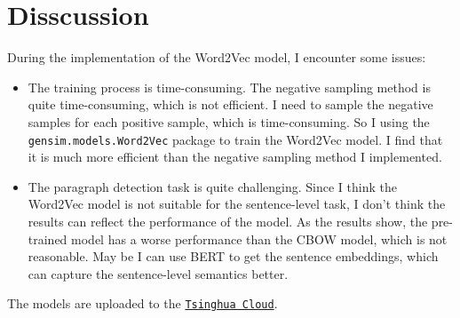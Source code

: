 \documentclass[UTF8,a4paper,12pt]{article}
\begin{document}
\section{Disscussion}

During the implementation of the Word2Vec model, I encounter some issues:

\begin{itemize}
    \item The training process is time-consuming. The negative sampling method is quite time-consuming, which is not efficient. I need to sample the negative samples for each positive sample, which is time-consuming. So I using the \texttt{gensim.models.Word2Vec} package to train the Word2Vec model. I find that it is much more efficient than the negative sampling method I implemented.
    \item The paragraph detection task is quite challenging. Since I think the Word2Vec model is not suitable for the sentence-level task, I don't think the results can reflect the performance of the model. As the results show, the pre-trained model has a worse performance than the CBOW model, which is not reasonable. May be I can use BERT to get the sentence embeddings, which can capture the sentence-level semantics better.
\end{itemize}

The models are uploaded to the \href{https://cloud.tsinghua.edu.cn/d/c305e8f2d8f446e19fce/}{\texttt{Tsinghua Cloud}}. 
\end{document}
